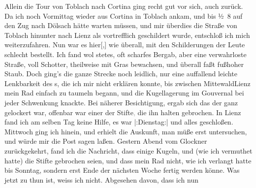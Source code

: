 \begin{ledgroupsized}[t]{13cm}
               Allein die Tour von Toblach nach Cortina ging recht gut vor sich, auch zurück. Da ich noch
                  Vormittag wieder aus Cortina in
                  Toblach ankam, und bis ½ 8 auf
               den Zug nach Dölsach hätte warten müssen, und mir
               überdies die Straße von Toblach hinunter nach Lienz als vortrefflich geschildert wurde,
               entschloß ich mich weiterzufahren. Nun war es hier{[},{]}{ }{\pb}wie überall, mit den
               Schilderungen der Leute schlecht bestellt. Ich fand wol stetes, oft scharfes Bergab,
               aber eine verwahrloste Straße, voll Schotter, theilweise mit Gras bewachsen, und
               überall faßt fußhoher Staub. Doch ging’s die ganze Strecke noch leidlich, nur eine
               auffallend leichte Lenkbarkeit des \label{K_L03128-2v}\label{K_L03128-2h}s, die
               ich mir nicht erklären konnte, bis zwischen MittewaldLienz mein Rad einfach zu taumeln begann, und die
               Kugellagerung im Gouvernal bei jeder Schwenkung knackte. Bei näherer Besichtigung,
               ergab sich das der \label{K_L03128-3v}\label{K_L03128-3h} ganz gelockert
               war, offenbar war einer der Stifte\textcolor{gray}{,} die ihn halten gebrochen. In Lienz fand ich am selben Tag
               keine Hilfe, es war |:Dienstag:| \label{K_L03128-4v}\label{K_L03128-4h} und alles geschloßen. Mittwoch ging ich hinein, und erhielt die Auskunft, man
               müße erst untersuchen, und würde mir die Post sagen laßen. Gestern{ }Abend vom Glockner zurückgekehrt,
               fand ich die Nachricht, dass einige Kugeln, und (wie ich vermuthet hatte) die Stifte
               gebrochen seien, und dass mein Rad nicht, wie ich {\pb}verlangt hatte bis Sonntag, sondern erst Ende der nächsten Woche fertig
               werden könne. Was jetzt zu thun ist, weiss ich nicht. Abgesehen davon, dass ich nun

\end{ledgroupsized}
